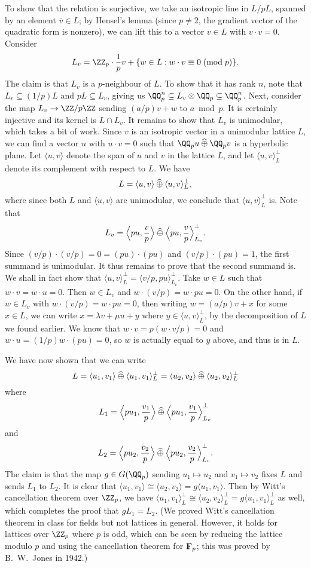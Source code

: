 To show that the relation is surjective, we take an isotropic line in $L/pL$, spanned by an element $\bar v\in L$;
by Hensel's lemma (since $p\ne 2$, the gradient vector of the quadratic form is nonzero),
we can lift this to a vector $v\in L$ with $v\cdot v = 0$. Consider
$$L_v = \ZZ_p\cdot {1\over p}v + \{w\in L : w\cdot v \equiv 0\pmod p\}.$$
The claim is that $L_v$ is a $p$-neighbour of $L$. To show that it has rank $n$, note that $L_v\subseteq (1/p)L$
and $pL\subseteq L_v$, giving us $\QQ_p^n \subseteq L_v\otimes \QQ_p\subseteq \QQ_p^n$. Next, consider
the map $L_v\to \ZZ/p\ZZ$ sending $(a/p)v + w$ to $a\bmod p$. It is certainly injective and its kernel is
$L\cap L_v$. It remains to show that $L_v$ is unimodular, which takes a bit of work. Since $v$ is an isotropic
vector in a unimodular lattice $L$, we can find a vector $u$ with $u\cdot v = 0$
such that $\QQ_p u \ortho \QQ_p v$ is a hyperbolic plane. Let $\langle u,v\rangle$ denote the span of
$u$ and $v$ in the lattice $L$, and let $\langle u,v\rangle^\perp_L$ denote its complement with respect to $L$.
We have
$$L = \langle u,v\rangle \mathbin{\widehat\oplus} \langle u,v\rangle^\perp_L,$$
where since both $L$ and $\langle u,v\rangle$ are unimodular, we conclude that $\langle u,v\rangle^\perp_L$ is.
Note that
$$L_v = \Bigl\langle pu,{v\over p}\Bigr\rangle \mathbin{\widehat\oplus} \Bigl\langle pu,{v\over p}\Bigr\rangle^\perp_{L_v}.$$
Since $(v/p)\cdot(v/p) = 0 = (p u)\cdot (pu)$ and $(v/p)\cdot (pu) = 1$, the first summand is unimodular.
It thus remains to prove that the second summand is. We shall in fact show that
$\langle u,v\rangle^\perp_L = \langle v/p, pu\rangle^\perp_{L_v}$. Take $w\in L$ such that $w\cdot v=w\cdot u=0$.
Then $w\in L_v$ and $w\cdot (v/p) = w\cdot pu = 0$. On the other hand, if $w\in L_v$ with
$w\cdot (v/p) = w\cdot pu = 0$, then writing $w = (a/p)v + x$ for some $x\in L$, we can write
$x = \lambda v + \mu u + y$ where $y\in \langle u,v\rangle^\perp_L$, by the decomposition of $L$ we found earlier.
We know that $w\cdot v = p(w\cdot v/p) = 0$ and $w\cdot u = (1/p)w\cdot(pu) = 0$, so $w$ is actually equal to $y$
above, and thus is in $L$.

We have now shown that we can write
$$L = \langle u_1,v_1\rangle \mathbin{\widehat\oplus} \langle u_1,v_1\rangle_L^\perp =
\langle u_2,v_2\rangle \mathbin{\widehat\oplus}       \langle u_2,v_2\rangle_L^\perp$$
where
$$L_1 = \Bigl\langle pu_1,{v_1\over p}\Bigr\rangle \mathbin{\widehat\oplus}
\Bigl\langle pu_1,{v_1\over p}\Bigr\rangle^\perp_{L_v}$$
and
$$L_2 = \Bigl\langle pu_2,{v_2\over p}\Bigr\rangle \mathbin{\widehat\oplus}
\Bigl\langle pu_2,{v_2\over p}\Bigr\rangle^\perp_{L_v}.$$
The claim is that the map $g\in G(\QQ_p)$ sending
$u_1\mapsto u_2$ and $v_1\mapsto v_2$ fixes $L$ and sends $L_1$ to $L_2$.
It is clear that $\langle u_1,v_1\rangle \cong \langle u_2, v_2\rangle = g\langle u_1,v_1\rangle$.
Then by Witt's cancellation theorem
over $\ZZ_p$, we have $\langle u_1,v_1\rangle_L^\perp \cong \langle u_2,v_2\rangle_L^\perp =
g\langle u_1,v_1\rangle_L^\perp$ as well, which
completes the proof that $gL_1 = L_2$. (We proved Witt's cancellation theorem in class for fields but not lattices
in general. However, it holds for lattices over $\ZZ_p$ where $p$ is odd,
which can be seen by reducing the lattice modulo $p$
and using the cancellation theorem for ${\bf F}_p$; this was proved by B.~W.~Jones in 1942.)
\slug

